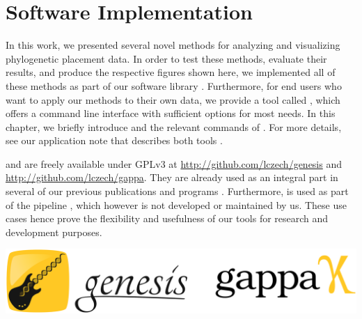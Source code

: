 
\cleardoublepage

\chapter{Software Implementation}
\label{ch:PipelineImplementation}


In this work, we presented several novel methods for analyzing and visualizing phylogenetic placement data.
In order to test these methods, evaluate their results, and produce the respective figures shown here,
we implemented all of these methods as part of our software library .
Furthermore, for end users who want to apply our methods to their own data,
we provide a tool called , which offers a command line interface with sufficient options for most needs.
In this chapter, we briefly introduce  and the relevant commands of .
For more details, see our application note that describes both tools \cite{Czech2019-genesis-gappa}.

 and  are freely available under GPLv3
at \url{http://github.com/lczech/genesis} and \url{http://github.com/lczech/gappa}.
They are already used as an integral part
in several of our previous publications and programs \cite{Mahe2017,Barbera2018,Zhou2017,Czech2018-phat,Czech2019-analysis}.
Furthermore,  is used as part of the  pipeline \cite{Douglas2019},
which however is not developed or maintained by us.
These use cases hence prove the flexibility and usefulness of our tools for research and development purposes.

\vspace*{1.5em}
\includegraphics[width=\linewidth]{pdf/logos.pdf}

